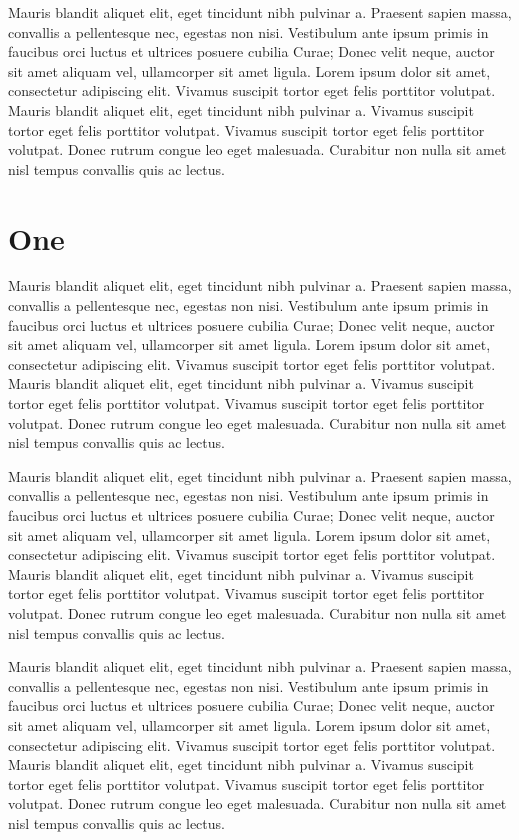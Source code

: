 \documentclass{scrbook}
\begin{document}
Mauris blandit aliquet elit, eget tincidunt nibh pulvinar a. Praesent
sapien massa, convallis a pellentesque nec, egestas non nisi. Vestibulum
ante ipsum primis in faucibus orci luctus et ultrices posuere cubilia
Curae; Donec velit neque, auctor sit amet aliquam vel, ullamcorper sit
amet ligula. Lorem ipsum dolor sit amet, consectetur adipiscing elit.
Vivamus suscipit tortor eget felis porttitor volutpat. Mauris blandit
aliquet elit, eget tincidunt nibh pulvinar a. Vivamus suscipit tortor
eget felis porttitor volutpat. Vivamus suscipit tortor eget felis
porttitor volutpat. Donec rutrum congue leo eget malesuada. Curabitur
non nulla sit amet nisl tempus convallis quis ac lectus.

\section{One}\label{c3-c3-one}

Mauris blandit aliquet elit, eget tincidunt nibh pulvinar a. Praesent
sapien massa, convallis a pellentesque nec, egestas non nisi. Vestibulum
ante ipsum primis in faucibus orci luctus et ultrices posuere cubilia
Curae; Donec velit neque, auctor sit amet aliquam vel, ullamcorper sit
amet ligula. Lorem ipsum dolor sit amet, consectetur adipiscing elit.
Vivamus suscipit tortor eget felis porttitor volutpat. Mauris blandit
aliquet elit, eget tincidunt nibh pulvinar a. Vivamus suscipit tortor
eget felis porttitor volutpat. Vivamus suscipit tortor eget felis
porttitor volutpat. Donec rutrum congue leo eget malesuada. Curabitur
non nulla sit amet nisl tempus convallis quis ac lectus.

Mauris blandit aliquet elit, eget tincidunt nibh pulvinar a. Praesent
sapien massa, convallis a pellentesque nec, egestas non nisi. Vestibulum
ante ipsum primis in faucibus orci luctus et ultrices posuere cubilia
Curae; Donec velit neque, auctor sit amet aliquam vel, ullamcorper sit
amet ligula. Lorem ipsum dolor sit amet, consectetur adipiscing elit.
Vivamus suscipit tortor eget felis porttitor volutpat. Mauris blandit
aliquet elit, eget tincidunt nibh pulvinar a. Vivamus suscipit tortor
eget felis porttitor volutpat. Vivamus suscipit tortor eget felis
porttitor volutpat. Donec rutrum congue leo eget malesuada. Curabitur
non nulla sit amet nisl tempus convallis quis ac lectus.

Mauris blandit aliquet elit, eget tincidunt nibh pulvinar a. Praesent
sapien massa, convallis a pellentesque nec, egestas non nisi. Vestibulum
ante ipsum primis in faucibus orci luctus et ultrices posuere cubilia
Curae; Donec velit neque, auctor sit amet aliquam vel, ullamcorper sit
amet ligula. Lorem ipsum dolor sit amet, consectetur adipiscing elit.
Vivamus suscipit tortor eget felis porttitor volutpat. Mauris blandit
aliquet elit, eget tincidunt nibh pulvinar a. Vivamus suscipit tortor
eget felis porttitor volutpat. Vivamus suscipit tortor eget felis
porttitor volutpat. Donec rutrum congue leo eget malesuada. Curabitur
non nulla sit amet nisl tempus convallis quis ac lectus.
\end{document}
